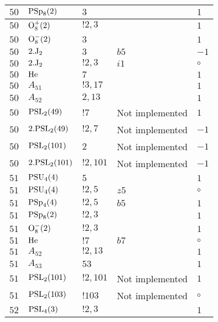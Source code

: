 \documentclass[a4paper, 11pt]{article}
\begin{document}
\begin{longtable}{lllll}
        $ 50 $ & $ {\rm PSp}_{8}(2) $ & $ 3 $ & $ ~ $ & $ 1$ \\ \hline
        $ 50 $ & $ {\rm O}_{8}^+(2) $ & $ ! 2,3 $ & $ ~ $ & $ 1$ \\ \hline
        $ 50 $ & $ {\rm O}_{8}^-(2) $ & $ 3 $ & $ ~ $ & $ 1$ \\ \hline
        $ 50 $ & $ 2.{\rm J}_2 $ & $ 3 $ & $ b5 $ & $ -1$ \\ \hline
        $ 50 $ & $ 2.{\rm J}_2 $ & $ ! 2,3 $ & $ i1 $ &  $\circ$ \\ \hline
        $ 50 $ & $ {\rm He} $ & $ 7 $ & $ ~ $ & $ 1$ \\ \hline
        $ 50 $ & $ A_{51} $ & $ !3, 17 $ & $ ~ $ & $ 1$ \\ \hline
        $ 50 $ & $ A_{52} $ & $ 2, 13 $ & $ ~ $ & $ 1$ \\ \hline
        $ 50 $ & $ {\rm PSL}_{2}(49) $ & $ !7 $ &  Not implemented & $ 1$ \\ \hline
        $ 50 $ & $ 2.{\rm PSL}_{2}(49) $ & $ !2, 7 $ &  Not implemented & $ -1$ \\ \hline
        $ 50 $ & $ {\rm PSL}_{2}(101) $ & $ 2 $ &  Not implemented & $ -1$ \\ \hline
        $ 50 $ & $ 2.{\rm PSL}_{2}(101) $ & $ !2, 101 $ &  Not implemented & $ -1$ \\ \hline
        $ 51 $ & $ {\rm PSU}_{4}(4) $ & $ 5 $ & $ ~ $ & $ 1$ \\ \hline
        $ 51 $ & $ {\rm PSU}_{4}(4) $ & $ ! 2,5 $ & $ z5 $ &  $\circ$ \\ \hline
        $ 51 $ & $ {\rm PSp}_{4}(4) $ & $ ! 2,5 $ & $ b5 $ & $ 1$ \\ \hline
        $ 51 $ & $ {\rm PSp}_{8}(2) $ & $ ! 2,3 $ & $ ~ $ & $ 1$ \\ \hline
        $ 51 $ & $ {\rm O}_{8}^-(2) $ & $ ! 2,3 $ & $ ~ $ & $ 1$ \\ \hline
        $ 51 $ & $ {\rm He} $ & $ ! 7 $ & $ b7 $ &  $\circ$ \\ \hline
        $ 51 $ & $ A_{52} $ & $ !2, 13 $ & $ ~ $ & $ 1$ \\ \hline
        $ 51 $ & $ A_{53} $ & $ 53 $ & $ ~ $ & $ 1$ \\ \hline
        $ 51 $ & $ {\rm PSL}_{2}(101) $ & $ !2, 101 $ &  Not implemented & $ 1$ \\ \hline
        $ 51 $ & $ {\rm PSL}_{2}(103) $ & $ !103 $ &  Not implemented &  $\circ$ \\ \hline
        $ 52 $ & $ {\rm PSL}_{4}(3) $ & $ ! 2,3 $ & $ ~ $ & $ 1$ \\ \hline

\end{longtable}
\end{document}
